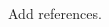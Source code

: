 \documentclass[11pt]{article}
\begin{document}
\setcounter{page}{2}

\begin{thebibliography}{99}

 Add references.


\end{thebibliography}



\end{document}
